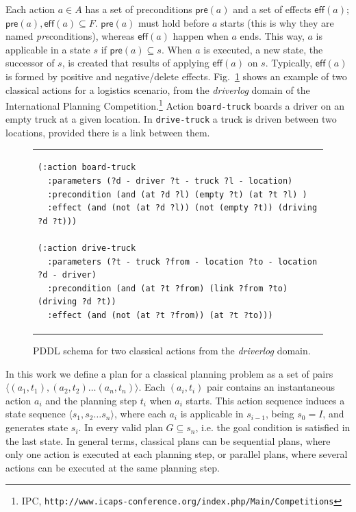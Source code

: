 \documentclass[runningheads]{llncs}
\newcommand{\tup}[1]{{\langle #1 \rangle}}
\newcommand{\pre}{\mathsf{pre}}    %
\newcommand{\eff}{\mathsf{eff}}    %
\begin{document}
Each action $a \in A$ has a set of preconditions $\pre(a)$ and a set of effects $\eff(a)$; $\pre(a), \eff(a) \subseteq F$. $\pre(a)$ must hold before $a$ starts (this is why they are named \emph{pre}conditions), whereas $\eff(a)$ happen when $a$ ends. This way, $a$ is applicable in a state $s$ if $\pre(a) \subseteq s$. When $a$ is executed, a new state, the successor of $s$, is created that results of applying $\eff(a)$ on $s$. Typically, $\eff(a)$ is formed by positive and negative/delete effects. Fig.~\ref{fig:exampleactions1} shows an example of two classical actions for a logistics scenario, from the \emph{driverlog} domain of the International Planning Competition.\footnote{IPC, \texttt{http://www.icaps-conference.org/index.php/Main/Competitions}} Action \texttt{board-truck} boards a driver on an empty truck at a given location. In \texttt{drive-truck} a truck is driven between two locations, provided there is a link between them.

\begin{figure}
\begin{tabular}{p{\textwidth}}
\begin{verbatim}
(:action board-truck
  :parameters (?d - driver ?t - truck ?l - location)
  :precondition (and (at ?d ?l) (empty ?t) (at ?t ?l) )
  :effect (and (not (at ?d ?l)) (not (empty ?t)) (driving ?d ?t)))

(:action drive-truck
  :parameters (?t - truck ?from - location ?to - location ?d - driver)
  :precondition (and (at ?t ?from) (link ?from ?to) (driving ?d ?t))
  :effect (and (not (at ?t ?from)) (at ?t ?to)))
\end{verbatim}
\end{tabular}
\caption{\small PDDL schema for two classical actions from the {\em driverlog} domain.}
\label{fig:exampleactions1}
\end{figure}


In this work we define a plan for a classical planning problem as a set of pairs $\tup{(a_1,t_1),(a_2,t_2)\ldots (a_n,t_n)}$. Each $(a_i,t_i)$ pair contains an instantaneous action $a_i$ and the planning step $t_i$ when $a_i$ starts.
This action sequence induces a state sequence $\tup{s_1,s_2\ldots s_n}$, where each $a_i$ is applicable in $s_{i-1}$, being $s_0=I$, and generates state $s_i$. In every valid plan $G\subseteq s_n$, i.e. the goal condition is satisfied in the last state.
In general terms, classical plans can be sequential plans, where only one action is executed at each planning step, or parallel plans, where several actions can be executed at the same planning step.
\end{document}
